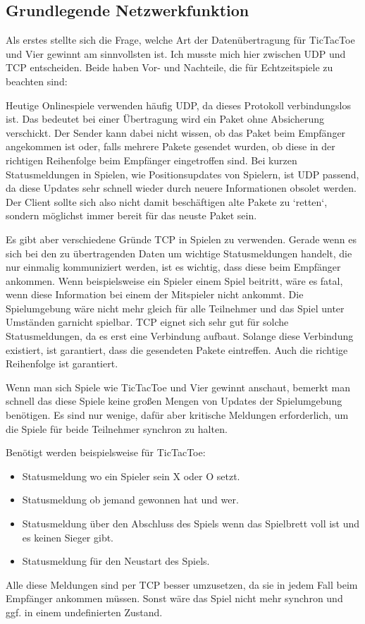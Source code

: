 \subsection{Grundlegende Netzwerkfunktion}
Als erstes stellte sich die Frage, welche Art der Datenübertragung für TicTacToe und Vier gewinnt am sinnvollsten ist.
Ich musste mich hier zwischen UDP und TCP entscheiden. Beide haben Vor- und Nachteile, die für Echtzeitspiele zu beachten sind:
\par
Heutige Onlinespiele verwenden häufig UDP, da dieses Protokoll verbindungslos ist.
Das bedeutet bei einer Übertragung wird ein Paket ohne Absicherung verschickt. Der Sender kann dabei nicht wissen, ob das Paket
beim Empfänger angekommen ist oder, falls mehrere Pakete gesendet wurden, ob diese in der richtigen Reihenfolge beim Empfänger
eingetroffen sind.
Bei kurzen Statusmeldungen in Spielen, wie Positionsupdates von Spielern, ist UDP passend, da diese Updates sehr schnell wieder
durch neuere Informationen obsolet werden. Der Client sollte sich also nicht damit beschäftigen alte Pakete zu `retten`, sondern
möglichst immer bereit für das neuste Paket sein.
\par
Es gibt aber verschiedene Gründe TCP in Spielen zu verwenden.
Gerade wenn es sich bei den zu übertragenden Daten um wichtige Statusmeldungen handelt, die nur einmalig kommuniziert werden,
ist es wichtig, dass diese beim Empfänger ankommen. Wenn beispielsweise ein Spieler einem Spiel beitritt, wäre es fatal,
wenn diese Information bei einem der Mitspieler nicht ankommt. Die Spielumgebung wäre nicht mehr gleich für alle Teilnehmer
und das Spiel unter Umständen garnicht spielbar. TCP eignet sich sehr gut für solche Statusmeldungen, da es erst eine Verbindung aufbaut.
Solange diese Verbindung existiert, ist garantiert, dass die gesendeten Pakete eintreffen. Auch die richtige Reihenfolge ist garantiert.
\par
Wenn man sich Spiele wie TicTacToe und Vier gewinnt anschaut, bemerkt man schnell das diese Spiele keine großen Mengen von Updates
der Spielumgebung benötigen. Es sind nur wenige, dafür aber kritische Meldungen erforderlich, um die Spiele für beide Teilnehmer
synchron zu halten.
\par
Benötigt werden beispielsweise für TicTacToe:
\begin{itemize}
    \item Statusmeldung wo ein Spieler sein X oder O setzt.
    \item Statusmeldung ob jemand gewonnen hat und wer.
    \item Statusmeldung über den Abschluss des Spiels wenn das Spielbrett voll ist und es keinen Sieger gibt.
    \item Statusmeldung für den Neustart des Spiels.
\end{itemize}
Alle diese Meldungen sind per TCP besser umzusetzen, da sie in jedem Fall beim Empfänger ankommen müssen. Sonst wäre das Spiel
nicht mehr synchron und ggf. in einem undefinierten Zustand.
